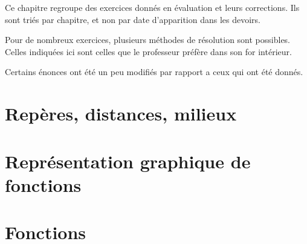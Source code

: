 
\begin{center}
    Ce chapitre regroupe des exercices donnés en évaluation et leurs corrections. Ils sont triés par chapitre, et non par date d'apparition dans les devoirs.

    Pour de nombreux exercices, plusieurs méthodes de résolution sont possibles. Celles indiquées ici sont celles que le professeur préfère dans son for intérieur.    
\end{center}
Certains énonces ont été un peu modifiés par rapport a ceux qui ont été donnés.



\section{Repères, distances, milieux}


\section{Représentation graphique de fonctions}


\section{Fonctions}

